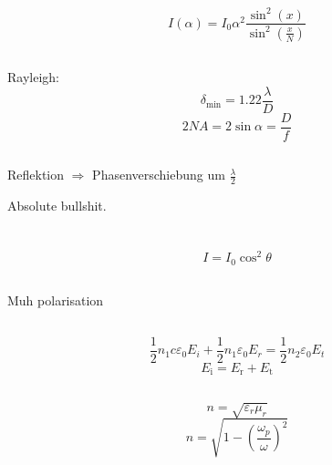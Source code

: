 \documentclass[12pt]{report}
\newcommand{\vepsilon}{\varepsilon}
\begin{document}
\[I(\alpha)=I_0\alpha^2\frac{\sin^2(x)}{\sin^2\left(\frac{x}{N}\right)}\]

\subsection{}

Rayleigh:
\[\delta_\mathrm{min}=1.22\frac{\lambda}{D}\]
\[2NA=2\sin\alpha=\frac{D}{f}\]

\subsection{}

Reflektion $\Rightarrow$ Phasenverschiebung um $\frac{\lambda}{2}$

Absolute bullshit.

\section{}

\subsection{}

\[I=I_0\cos^2\theta\]

\subsection{}
Muh polarisation

\subsection{}

\[\frac{1}{2}n_1c\vepsilon_0E_i+\frac{1}{2}n_1\vepsilon_0E_r=\frac{1}{2}n_2\vepsilon_0E_t\]
\[E_\mathrm{i}=E_\mathrm{r}+E_\mathrm{t}\]

\subsection{}

\[n=\sqrt{\vepsilon_r\mu_r}\]
\[n=\sqrt{1-\left(\frac{\omega_p}{\omega}\right)^2}\]

\section{}

\subsection{}
\end{document}
